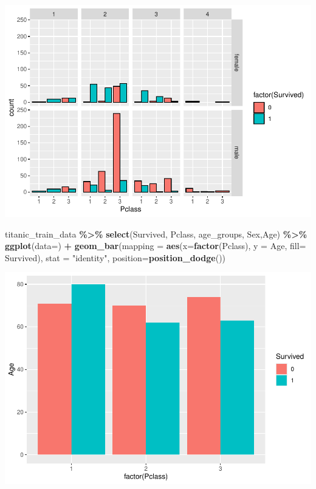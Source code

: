 \documentclass[
]{article}
\newenvironment{Shaded}{\begin{snugshade}}{\end{snugshade}}
\newcommand{\AttributeTok}[1]{\textcolor[rgb]{0.13,0.29,0.53}{#1}}
\newcommand{\FunctionTok}[1]{\textcolor[rgb]{0.13,0.29,0.53}{\textbf{#1}}}
\newcommand{\NormalTok}[1]{#1}
\newcommand{\SpecialCharTok}[1]{\textcolor[rgb]{0.81,0.36,0.00}{\textbf{#1}}}
\newcommand{\StringTok}[1]{\textcolor[rgb]{0.31,0.60,0.02}{#1}}
\begin{document}
\includegraphics{Titanic-Documentation_files/figure-latex/unnamed-chunk-35-1.pdf}

\begin{Shaded}
\begin{Highlighting}[]
\NormalTok{titanic\_train\_data }\SpecialCharTok{\%\textgreater{}\%}
  \FunctionTok{select}\NormalTok{(Survived, Pclass, age\_groups, Sex,Age) }\SpecialCharTok{\%\textgreater{}\%}
  \FunctionTok{ggplot}\NormalTok{(}\AttributeTok{data=}\NormalTok{) }\SpecialCharTok{+} 
  \FunctionTok{geom\_bar}\NormalTok{(}\AttributeTok{mapping =}  \FunctionTok{aes}\NormalTok{(}\AttributeTok{x=}\FunctionTok{factor}\NormalTok{(Pclass), }\AttributeTok{y =}\NormalTok{ Age, }\AttributeTok{fill=}\NormalTok{ Survived), }\AttributeTok{stat =} \StringTok{"identity"}\NormalTok{,  }\AttributeTok{position=}\FunctionTok{position\_dodge}\NormalTok{())}
\end{Highlighting}
\end{Shaded}

\includegraphics{Titanic-Documentation_files/figure-latex/unnamed-chunk-36-1.pdf}
\end{document}

